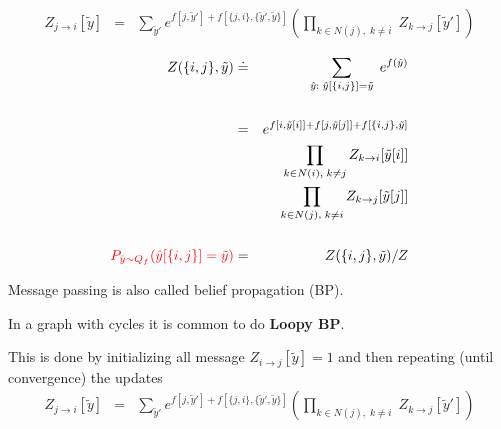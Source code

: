 {\vfill
\begin{eqnarray*}
  Z_{j\rightarrow i}[\tilde{y}] & = & \sum_{\tilde{y}'}  e^{f[j,\tilde{y}'] + f[\{j,i\},\{\tilde{y}',\tilde{y}\}]}
    \left(\prod_{k \in N(j),\;k \not = i}\;Z_{k\rightarrow j}[\tilde{y}']\right)
\end{eqnarray*}


\begin{eqnarray*}
Z(\{i,j\},\tilde{y}) & \doteq & \sum_{\hat{y}:\; \hat{y}[\{i,j\}] = \tilde{y}} \;e^{f(\hat{y})} \\
\\
& = & e^{f[i,\tilde{y}[i]] + f[j,\tilde{y}[j]] +f[\{i,j\},\tilde{y}]} \\
& & \prod_{k\in N(i),\;k \not = j} Z_{k \rightarrow i}[\tilde{y}[i]] \\
& & \prod_{k\in N(j),\;k \not = i} Z_{k \rightarrow j}[\tilde{y}[j]] \\
\\
{\color{red} P_{\hat{y}\sim Q_f}(\hat{y}[\{i,j\}] = \tilde{y})} & = & Z(\{i,j\},\tilde{y})/Z
\end{eqnarray*}


Message passing is also called belief propagation (BP).

\vfill
In a graph with cycles it is common to do {\bf Loopy BP}.

\vfill
This is done by initializing all message $Z_{i \rightarrow j}[\tilde{y}] = 1$ and then repeating (until convergence) the updates
\vfill
\begin{eqnarray*}
  Z_{j\rightarrow i}[\tilde{y}] & = & \sum_{\tilde{y}'}  e^{f[j,\tilde{y}'] + f[\{j,i\},\{\tilde{y}',\tilde{y}\}]}
    \left(\prod_{k \in N(j),\;k \not = i}\;Z_{k\rightarrow j}[\tilde{y}']\right)
\end{eqnarray*}


}


